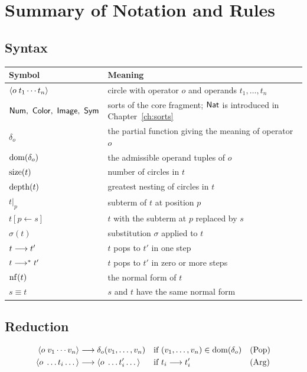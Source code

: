 \chapter{Summary of Notation and Rules}
\label{app:summary}

\section*{Syntax}

\begin{center}
\begin{tabular}{@{}ll@{}}
\toprule
Symbol & Meaning\\
\midrule
$\langle o\; t_1\cdots t_n\rangle$ & circle with operator $o$ and operands $t_1,\dots,t_n$\\
$\Num,\ \Color,\ \Image,\ \Sym$ & sorts of the core fragment; $\mathsf{Nat}$ is introduced in Chapter~\ref{ch:sorts}\\
$\delta_o$ & the partial function giving the meaning of operator $o$\\
$\operatorname{dom}(\delta_o)$ & the admissible operand tuples of $o$\\
$\operatorname{size}(t)$ & number of circles in $t$\\
$\operatorname{depth}(t)$ & greatest nesting of circles in $t$\\
$t|_p$ & subterm of $t$ at position $p$\\
$t[p\leftarrow s]$ & $t$ with the subterm at $p$ replaced by $s$\\
$\sigma(t)$ & substitution $\sigma$ applied to $t$\\
$t\longrightarrow t'$ & $t$ pops to $t'$ in one step\\
$t\longrightarrow^{*} t'$ & $t$ pops to $t'$ in zero or more steps\\
$\operatorname{nf}(t)$ & the normal form of $t$\\
$s\equiv t$ & $s$ and $t$ have the same normal form\\
\bottomrule
\end{tabular}
\end{center}

\section*{Reduction}

\begin{align*}
\langle o\; v_1\cdots v_n\rangle &\longrightarrow \delta_o(v_1,\dots,v_n) &&\text{if }(v_1,\dots,v_n)\in\operatorname{dom}(\delta_o) &&\text{(Pop)}\\
\langle o\; \dots t_i\dots\rangle &\longrightarrow \langle o\; \dots t_i'\dots\rangle &&\text{if } t_i\longrightarrow t_i' &&\text{(Arg)}
\end{align*}

